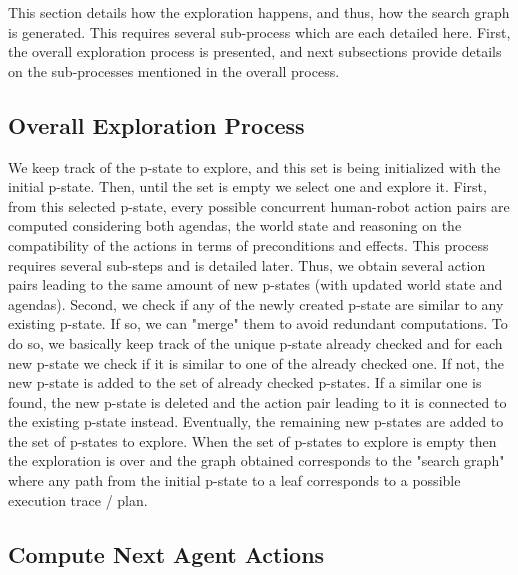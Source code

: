 This section details how the exploration happens, and thus, how the search graph is generated. This requires several sub-process which are each detailed here. First, the overall exploration process is presented, and next subsections provide details on the sub-processes mentioned in the overall process.

    \subsection{Overall Exploration Process}

We keep track of the p-state to explore, and this set is being initialized with the initial p-state. Then, until the set is empty we select one and explore it.
First, from this selected p-state, every possible concurrent human-robot action pairs are computed considering both agendas, the world state and reasoning on the compatibility of the actions in terms of preconditions and effects. This process requires several sub-steps and is detailed later. Thus, we obtain several action pairs leading to the same amount of new p-states (with updated world state and agendas).
Second, we check if any of the newly created p-state are similar to any existing p-state. If so, we can "merge" them to avoid redundant computations. To do so, we basically keep track of the unique p-state already checked and for each new p-state we check if it is similar to one of the already checked one. 
If not, the new p-state is added to the set of already checked p-states. 
If a similar one is found, the new p-state is deleted and the action pair leading to it is connected to the existing p-state instead.
Eventually, the remaining new p-states are added to the set of p-states to explore. 
When the set of p-states to explore is empty then the exploration is over and the graph obtained corresponds to the "search graph" where any path from the initial p-state to a leaf corresponds to a possible execution trace / plan.

    \subsection{Compute Next Agent Actions}

